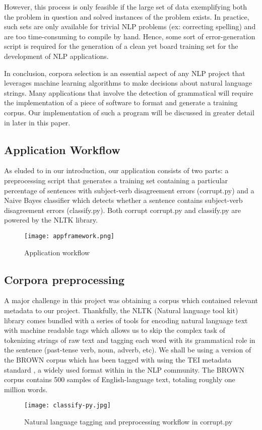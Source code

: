 \documentclass{article}
\begin{document}
However, this process is only feasible if the large set of data exemplifying both the problem in question and solved instances of the problem exists. In practice, such sets are only available for trivial NLP problems (ex: correcting spelling) and are too time-consuming to compile by hand. Hence, some sort of error-generation script \citep{Ryerson} is required for the generation of a clean yet board training set for the development of NLP  applications.

In conclusion, corpora selection is an essential aspect of any NLP project that leverages machine learning algorithms to make decisions about natural language strings. Many applications that involve the detection of grammatical will require the implementation of a piece of software to format and generate a training corpus. Our implementation of such a program will be discussed in greater detail in later in this paper.

\subsection{Application Workflow}
As eluded to in our introduction, our application consists of two parts: a preprocessing script that generates a training set containing a particular percentage of sentences with subject-verb disagreement errors (corrupt.py) and a Naive Bayes classifier which detects whether a sentence contains subject-verb disagreement errors (classify.py). Both corrupt corrupt.py and classify.py are powered by the NLTK \citep{NLTK} library.  
\begin{center}
\begin{figure}[h!]
\centering
\texttt{[image: appframework.png]}
\caption{Application workflow}
\label{fig:univerise}
\end{figure}
\end{center}

\subsection{Corpora preprocessing}
A major challenge in this project was obtaining a corpus which contained relevant metadata to our project. Thankfully, the NLTK (Natural language tool kit) library comes bundled with a series of tools for encoding natural language text with machine readable tags which allows us to skip the complex task of tokenizing strings of raw text and tagging each word with its grammatical role in the sentence (past-tense verb, noun, adverb, etc). We shall be using a version of the BROWN corpus which has been tagged with using the TEI metadata standard \citep{TEI}, a widely used format within in the NLP community. The BROWN corpus contains 500 samples of English-language text, totaling roughly one million words. \citep{Brown}
\begin{center}
\begin{figure}[h!]
\centering
\texttt{[image: classify-py.jpg]}
\caption{Natural language tagging and preprocessing workflow in corrupt.py}
\label{fig:univerise}
\end{figure}
\end{center}
\end{document}
